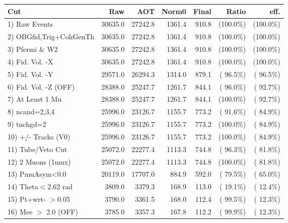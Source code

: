  \begin{table}[h!]\centering
 \begin{tabular}{||l||r|r|r|r|r|r||}
 \hline
 \hline
 Cut & Raw & AOT & Norm0 & Final & Ratio & eff.       \\
 \hline
  1) Raw Events           &      30635.0 &      27242.8 &       1361.4 &        910.8 & (100.0\%) & (100.0\%) \\
  2) OBGfid,Trig+CohGenTh &      30635.0 &      27242.8 &       1361.4 &        910.8 & (100.0\%) & (100.0\%) \\
  3) Pfermi \& W2         &      30635.0 &      27242.8 &       1361.4 &        910.8 & (100.0\%) & (100.0\%) \\
  4) Fid. Vol. -X         &      30635.0 &      27242.8 &       1361.4 &        910.8 & (100.0\%) & (100.0\%) \\
  5) Fid. Vol. -Y         &      29571.0 &      26294.3 &       1314.0 &        879.1 & ( 96.5\%) & ( 96.5\%) \\
  6) Fid. Vol. -Z (OFF)   &      28388.0 &      25247.7 &       1261.7 &        844.1 & ( 96.0\%) & ( 92.7\%) \\
  7) At Least 1 Mu        &      28388.0 &      25247.7 &       1261.7 &        844.1 & (100.0\%) & ( 92.7\%) \\
  8) ncand=2,3,4          &      25996.0 &      23126.7 &       1155.7 &        773.2 & ( 91.6\%) & ( 84.9\%) \\
  9) tnchgd=2             &      25996.0 &      23126.7 &       1155.7 &        773.2 & (100.0\%) & ( 84.9\%) \\
 10) +/- Tracks (V0)      &      25996.0 &      23126.7 &       1155.7 &        773.2 & (100.0\%) & ( 84.9\%) \\
 11) Tube/Veto Cut        &      25072.0 &      22277.4 &       1113.3 &        744.8 & ( 96.3\%) & ( 81.8\%) \\
 12) 2 Muons (1mux)       &      25072.0 &      22277.4 &       1113.3 &        744.8 & (100.0\%) & ( 81.8\%) \\
 13) PmuAsym<0.0          &      20119.0 &      17707.0 &        884.9 &        592.0 & ( 79.5\%) & ( 65.0\%) \\
 14) Theta$<$2.62 rad     &       3809.0 &       3379.3 &        168.9 &        113.0 & ( 19.1\%) & ( 12.4\%) \\
 15) Pt+wrt- $>$0.05      &       3790.0 &       3361.5 &        168.0 &        112.4 & ( 99.5\%) & ( 12.3\%) \\
 16) Mee $>$ 2.0  (OFF)   &       3785.0 &       3357.3 &        167.8 &        112.2 & ( 99.9\%) & ( 12.3\%) \\

\end{tabular}
\end{table}
